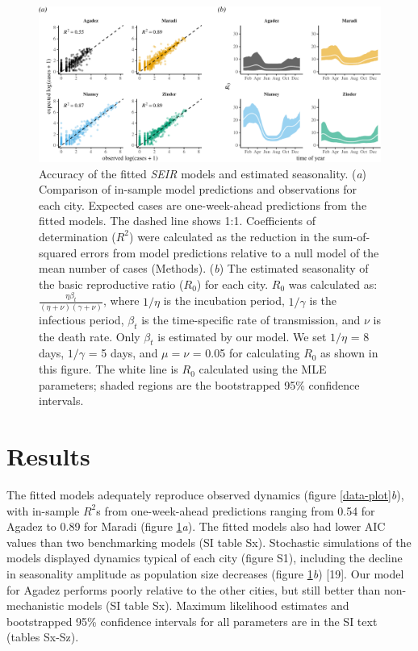 \documentclass[3p]{elsarticle} %
\makeatletter
\def\maxwidth{\ifdim\Gin@nat@width>\linewidth\linewidth
\else\Gin@nat@width\fi}
\let\Oldincludegraphics\includegraphics
\renewcommand{\includegraphics}[1]{\Oldincludegraphics[width=\maxwidth]{#1}}
\makeatother
\begin{document}
\begin{figure}
\centering
\includegraphics{measles-ews-manuscript_files/figure-latex/scatters-r0-1.pdf}
\caption{Accuracy of the fitted \emph{SEIR} models and estimated
seasonality. (\emph{a}) Comparison of in-sample model predictions and
observations for each city. Expected cases are one-week-ahead
predictions from the fitted models. The dashed line shows 1:1.
Coefficients of determination (\(R^2\)) were calculated as the reduction
in the sum-of-squared errors from model predictions relative to a null
model of the mean number of cases (Methods). (\emph{b}) The estimated
seasonality of the basic reproductive ratio (\(R_0\)) for each city.
\(R_0\) was calculated as:
\(\frac{\eta \beta_t}{(\eta+\nu)(\gamma+\nu)}\), where \(1/\eta\) is the
incubation period, \(1/\gamma\) is the infectious period, \(\beta_t\) is
the time-specific rate of transmission, and \(\nu\) is the death rate.
Only \(\beta_t\) is estimated by our model. We set \(1/\eta\) = 8 days,
\(1/\gamma\) = 5 days, and \(\mu = \nu\) = 0.05 for calculating \(R_0\)
as shown in this figure. The white line is \(R_0\) calculated using the
MLE parameters; shaded regions are the bootstrapped 95\% confidence
intervals. \label{scatters}}
\end{figure}

\hypertarget{results}{%
\section{Results}\label{results}}

The fitted models adequately reproduce observed dynamics (figure
\ref{data-plot}\emph{b}), with in-sample \(R^2\)s from one-week-ahead
predictions ranging from 0.54 for Agadez to 0.89 for Maradi (figure
\ref{scatters}\emph{a}). The fitted models also had lower AIC values
than two benchmarking models (SI table Sx). Stochastic simulations of
the models displayed dynamics typical of each city (figure S1),
including the decline in seasonality amplitude as population size
decreases (figure \ref{scatters}\emph{b}) {[}19{]}. \ignorespaces Our
model for Agadez performs poorly relative to the other cities, but still
better than non-mechanistic models (SI table Sx). Maximum likelihood
estimates and bootstrapped 95\% confidence intervals for all parameters
are in the SI text (tables Sx-Sz).
\end{document}
